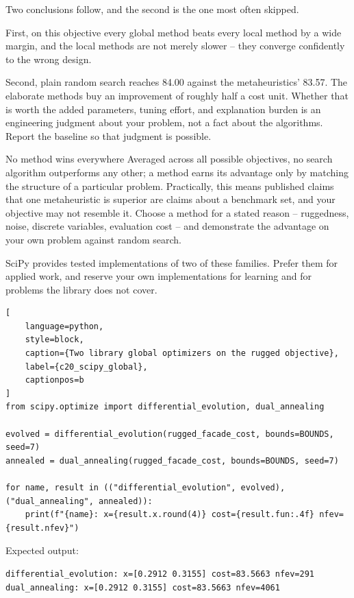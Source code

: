 Two conclusions follow, and the second is the one most often skipped.

First, on this objective every global method beats every local method by a wide
margin, and the local methods are not merely slower -- they converge confidently
to the wrong design.

Second, plain random search reaches 84.00 against the metaheuristics' 83.57. The
elaborate methods buy an improvement of roughly half a cost unit. Whether that
is worth the added parameters, tuning effort, and explanation burden is an
engineering judgment about your problem, not a fact about the algorithms. Report
the baseline so that judgment is possible.

\begin{ExplainBox}{No method wins everywhere}
Averaged across all possible objectives, no search algorithm outperforms any
other; a method earns its advantage only by matching the structure of a
particular problem. Practically, this means published claims that one
metaheuristic is superior are claims about a benchmark set, and your objective
may not resemble it. Choose a method for a stated reason -- ruggedness, noise,
discrete variables, evaluation cost -- and demonstrate the advantage on your own
problem against random search.
\end{ExplainBox}


SciPy provides tested implementations of two of these families. Prefer them for
applied work, and reserve your own implementations for learning and for
problems the library does not cover.

\begin{lstlisting}[
    language=python,
    style=block,
    caption={Two library global optimizers on the rugged objective},
    label={c20_scipy_global},
    captionpos=b
]
from scipy.optimize import differential_evolution, dual_annealing

evolved = differential_evolution(rugged_facade_cost, bounds=BOUNDS, seed=7)
annealed = dual_annealing(rugged_facade_cost, bounds=BOUNDS, seed=7)

for name, result in (("differential_evolution", evolved), ("dual_annealing", annealed)):
    print(f"{name}: x={result.x.round(4)} cost={result.fun:.4f} nfev={result.nfev}")
\end{lstlisting}

Expected output:

\begin{lstlisting}[language=text, style=block, caption={Library global optimizers find the same design at different costs}, label={c20_scipy_output}, captionpos=b]
differential_evolution: x=[0.2912 0.3155] cost=83.5663 nfev=291
dual_annealing: x=[0.2912 0.3155] cost=83.5663 nfev=4061
\end{lstlisting}

